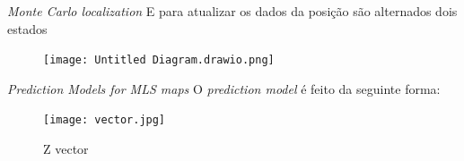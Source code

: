 \begin{frame}[c]{\textit{Monte Carlo localization}}
    E para atualizar os dados da posição são alternados dois estados
    \newline

    \begin{center}
        \begin{figure}
            \texttt{[image: Untitled Diagram.drawio.png]}
        \end{figure}
    \end{center}

\end{frame}


\begin{frame}[c]{\textit{Prediction Models for MLS maps}}
    O \textit{prediction model} é feito da seguinte forma:

        \begin{center}
            \begin{figure}
                \texttt{[image: vector.jpg]}
                \caption{Z vector\cite{article}}
            \end{figure}
        \end{center}

\end{frame}

